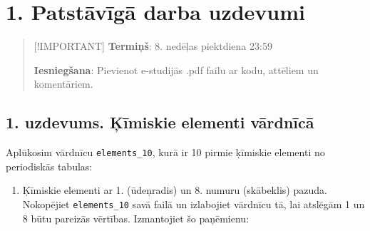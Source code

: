 \section{1. Patstāvīgā darba
uzdevumi}\label{patstux101vux12bgux101-darba-uzdevumi}

\begin{quote}
{[}!IMPORTANT{]} \textbf{Termiņš}: 8. nedēļas piektdiena 23:59

\textbf{Iesniegšana}: Pievienot e-studijās .pdf failu ar kodu, attēliem
un komentāriem.
\end{quote}

\subsection{1. uzdevums. Ķīmiskie elementi
vārdnīcā}\label{uzdevums.-ux137ux12bmiskie-elementi-vux101rdnux12bcux101}

Aplūkosim vārdnīcu \texttt{elements\_10}, kurā ir 10 pirmie ķīmiskie
elementi no periodiskās tabulas:

\begin{Shaded}
\begin{Highlighting}[]
\OperatorTok{=}\NormalTok{ \{}\NormalTok{: }\StringTok{\textquotesingle{}\textquotesingle{}}\NormalTok{, }\NormalTok{: }\NormalTok{, }\NormalTok{: }\NormalTok{,}
\NormalTok{: }\NormalTok{, }\NormalTok{: }\NormalTok{, }\NormalTok{: }\NormalTok{,}
\NormalTok{: }\NormalTok{, }\NormalTok{: }\StringTok{\textquotesingle{}\textquotesingle{}}\NormalTok{,}
\NormalTok{: }\NormalTok{, }\NormalTok{: }\NormalTok{\}}
\end{Highlighting}
\end{Shaded}

\begin{enumerate}
\def\labelenumi{\alph{enumi})}
\tightlist
\item
  Ķīmiskie elementi ar 1. (ūdeņradis) un 8. numuru (skābeklis) pazuda.
  Nokopējiet \texttt{elements\_10} savā failā un izlabojiet vārdnīcu tā,
  lai atslēgām 1 un 8 būtu pareizās vērtības. Izmantojiet šo paņēmienu:
\end{enumerate}

